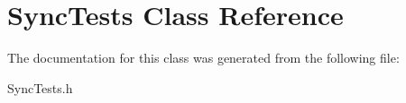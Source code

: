 \hypertarget{interface_sync_tests}{
\section{\-Sync\-Tests \-Class \-Reference}
\label{interface_sync_tests}
}


\-The documentation for this class was generated from the following file\-:\begin{DoxyCompactItemize}
\item 
\-Sync\-Tests.\-h\end{DoxyCompactItemize}
